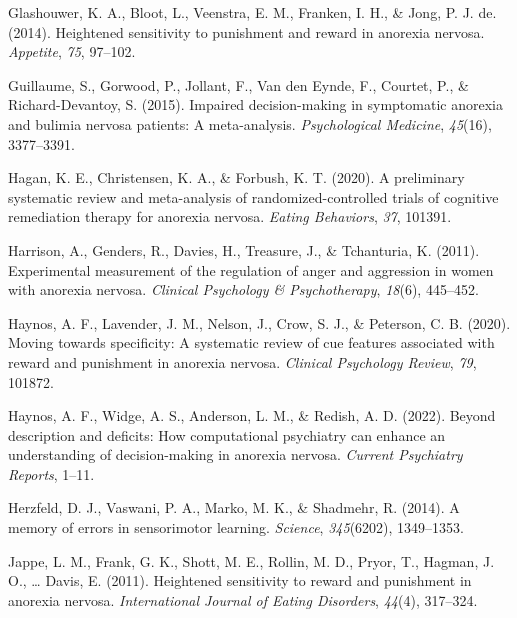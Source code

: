 \documentclass[
  man,floatsintext]{apa6}
\newlength{\cslhangindent}
\newlength{\cslentryspacingunit} %
\newenvironment{CSLReferences}[2] %
 {%
  \setlength{\parindent}{0pt}
  \ifodd #1
  \let\oldpar\par
  \def\par{\hangindent=\cslhangindent\oldpar}
  \fi
  \setlength{\parskip}{#2\cslentryspacingunit}
 }%
 {}
\begin{document}
\begin{CSLReferences}{1}{0}
\leavevmode{}%
Glashouwer, K. A., Bloot, L., Veenstra, E. M., Franken, I. H., \& Jong, P. J. de. (2014). Heightened sensitivity to punishment and reward in anorexia nervosa. \emph{Appetite}, \emph{75}, 97--102.

\leavevmode{}%
Guillaume, S., Gorwood, P., Jollant, F., Van den Eynde, F., Courtet, P., \& Richard-Devantoy, S. (2015). Impaired decision-making in symptomatic anorexia and bulimia nervosa patients: A meta-analysis. \emph{Psychological Medicine}, \emph{45}(16), 3377--3391.

\leavevmode{}%
Hagan, K. E., Christensen, K. A., \& Forbush, K. T. (2020). A preliminary systematic review and meta-analysis of randomized-controlled trials of cognitive remediation therapy for anorexia nervosa. \emph{Eating Behaviors}, \emph{37}, 101391.

\leavevmode{}%
Harrison, A., Genders, R., Davies, H., Treasure, J., \& Tchanturia, K. (2011). Experimental measurement of the regulation of anger and aggression in women with anorexia nervosa. \emph{Clinical Psychology \& Psychotherapy}, \emph{18}(6), 445--452.

\leavevmode{}%
Haynos, A. F., Lavender, J. M., Nelson, J., Crow, S. J., \& Peterson, C. B. (2020). Moving towards specificity: A systematic review of cue features associated with reward and punishment in anorexia nervosa. \emph{Clinical Psychology Review}, \emph{79}, 101872.

\leavevmode{}%
Haynos, A. F., Widge, A. S., Anderson, L. M., \& Redish, A. D. (2022). Beyond description and deficits: How computational psychiatry can enhance an understanding of decision-making in anorexia nervosa. \emph{Current Psychiatry Reports}, 1--11.

\leavevmode{}%
Herzfeld, D. J., Vaswani, P. A., Marko, M. K., \& Shadmehr, R. (2014). A memory of errors in sensorimotor learning. \emph{Science}, \emph{345}(6202), 1349--1353.

\leavevmode{}%
Jappe, L. M., Frank, G. K., Shott, M. E., Rollin, M. D., Pryor, T., Hagman, J. O., \ldots{} Davis, E. (2011). Heightened sensitivity to reward and punishment in anorexia nervosa. \emph{International Journal of Eating Disorders}, \emph{44}(4), 317--324.


\end{CSLReferences}
\end{document}
